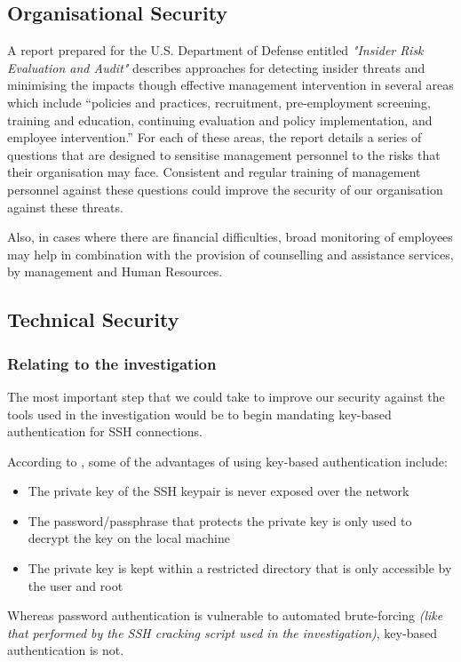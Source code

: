 \documentclass[12pt]{report}
\begin{document}
\subsection*{Organisational Security}
A report prepared for the U.S. Department of Defense entitled \textit{"Insider Risk Evaluation and Audit"} \citeyearpar{pdf:dod:insider_risk:200908} describes approaches for detecting insider threats and minimising the impacts though effective management intervention in several areas which include ``policies and practices, recruitment, pre-employment screening, training and education, continuing evaluation and policy implementation, and employee intervention.'' For each of these areas, the report details a series of questions that are designed to sensitise management personnel to the risks that their organisation may face. Consistent and regular training of management personnel against these questions could improve the security of our organisation against these threats.

Also, in cases where there are financial difficulties, broad monitoring of employees may help in combination with the provision of counselling and assistance services, by management and Human Resources.

\subsection*{Technical Security}
\subsubsection{Relating to the investigation}
The most important step that we could take to improve our security against the tools used in the investigation would be to begin mandating key-based authentication for SSH connections.

According to \cite{site:digitalocean:insider_threat_examples:20141020}, some of the advantages of using key-based authentication include:
\begin{itemize}
  \item The private key of the SSH keypair is never exposed over the network
  \item The password/passphrase that protects the private key is only used to decrypt the key on the local machine
  \item The private key is kept within a restricted directory that is only accessible by the user and root
\end{itemize}

Whereas password authentication is vulnerable to automated brute-forcing \textit{(like that performed by the SSH cracking script used in the investigation)}, key-based authentication is not.
\end{document}
